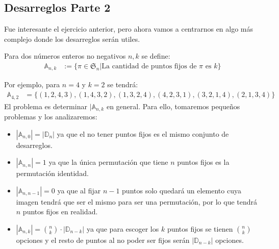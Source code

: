 \documentclass[12pt,a4paper,oneside]{memoir}
\begin{document}
\subsection*{Desarreglos Parte 2}
Fue interesante el ejercicio anterior, pero ahora vamos a centrarnos en algo más complejo donde los desarreglos serán utiles.
\begin{definition}
    Para dos números enteros no negativos $n, k$ se define:
    \begin{align*}
        \mathbb{A}_{n, k} &:= \{\pi \in \mathfrak{S}_n | \text{La cantidad de puntos fijos de $\pi$ es $k$}\}
    \end{align*}
\end{definition}
Por ejemplo, para $n=4$ y $k = 2$ se tendrá:
\begin{align*}
    \mathbb{A}_{4, 2} &= \{(1, 2, 4, 3), (1, 4, 3, 2), (1, 3, 2, 4), (4, 2, 3, 1), (3, 2, 1, 4), (2, 1, 3, 4)\}
\end{align*}
El problema es determinar $|\mathbb{A}_{n, k}$ en general. Para ello, tomaremos pequeños problemas y los analizaremos:
\begin{itemize}
    \item $|\mathbb{A}_{n, 0}| = |\mathbb{D}_{n}|$ ya que el no tener puntos fijos es el mismo conjunto de desarreglos.
    \item $|\mathbb{A}_{n, n}| = 1$ ya que la única permutación que tiene $n$ puntos fijos es la permutación identidad.
    \item $|\mathbb{A}_{n, n-1}| = 0$ ya que al fijar $n-1$ puntos solo quedará un elemento cuya imagen tendrá que ser el mismo para ser una permutación, por lo que tendrá $n$ puntos fijos en realidad.
    \item $|\mathbb{A}_{n, k}| = \binom{n}{k} \cdot |\mathbb{D}_{n-k}|$ ya que para escoger los $k$ puntos fijos se tienen $\binom{n}{k}$ opciones y el resto de puntos al no poder ser fijos serán $|\mathbb{D}_{n-k}|$ opciones.
\end{itemize}
\end{document}
